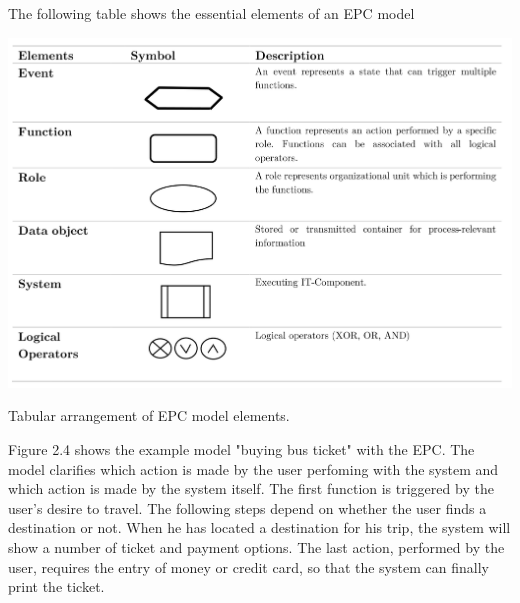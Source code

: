 \newpage
The following table shows the essential elements of an EPC model

\begin{table}[!hb]
	\centering
	\label{tbl:TableLatexShortened}
	\includegraphics[scale=0.25]{EPC-1}
	\caption{Tabular arrangement of EPC model elements.}
\end{table}

Figure 2.4 shows the example model "buying bus ticket" with the EPC. The model clarifies which action is made by the user perfoming with the system and which action is made by the system itself. The first function is triggered by the user's desire to travel. The following steps depend on whether the user finds a destination or not. When he has located a destination for his trip, the system will show a number of ticket and payment options. The last action, performed by the user, requires the entry of money or credit card, so that the system can finally print the ticket.

